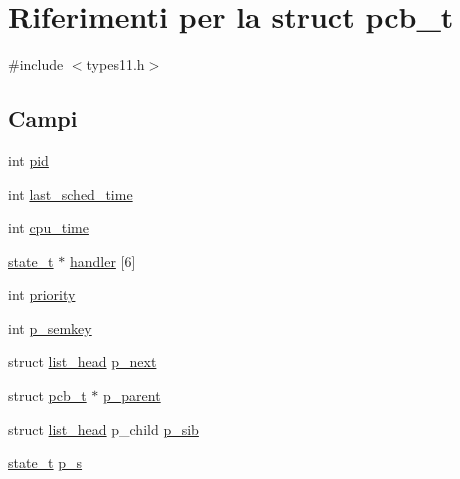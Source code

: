 \hypertarget{structpcb__t}{\section{Riferimenti per la struct pcb\-\_\-t}
\label{structpcb__t}
}


{\ttfamily \#include $<$types11.\-h$>$}

\subsection*{Campi}
\begin{DoxyCompactItemize}
\item 
int \hyperlink{structpcb__t_af500917c052066b40cf47f96b43c607b}{pid}
\item 
int \hyperlink{structpcb__t_aab19ac996ae189b600c68cb4e4e8b66b}{last\-\_\-sched\-\_\-time}
\item 
int \hyperlink{structpcb__t_a7438f6e4370c77335272481935c3c2da}{cpu\-\_\-time}
\item 
\hyperlink{structstate__t}{state\-\_\-t} $\ast$ \hyperlink{structpcb__t_aafb68b6d949df584f04372a411587a3e}{handler} \mbox{[}6\mbox{]}
\item 
int \hyperlink{structpcb__t_acec9ce2df15222151ad66fcb1d74eb9f}{priority}
\item 
int \hyperlink{structpcb__t_a831f803a73e91f4b1530e60bc24e92b4}{p\-\_\-semkey}
\item 
struct \hyperlink{structlist__head}{list\-\_\-head} \hyperlink{structpcb__t_adb25d84c36e53123e815e122610fd3ab}{p\-\_\-next}
\item 
struct \hyperlink{structpcb__t}{pcb\-\_\-t} $\ast$ \hyperlink{structpcb__t_a9e790d449812df0e71df251bb744648a}{p\-\_\-parent}
\item 
struct \hyperlink{structlist__head}{list\-\_\-head} p\-\_\-child \hyperlink{structpcb__t_ae571e01892f17d1ccf6332d96e6c5373}{p\-\_\-sib}
\item 
\hyperlink{structstate__t}{state\-\_\-t} \hyperlink{structpcb__t_ae1524fbfc37b7766b551477e48b3bf4d}{p\-\_\-s}
\end{DoxyCompactItemize}


